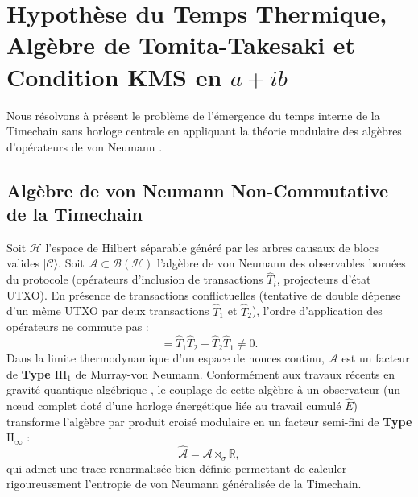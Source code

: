 \documentclass[10pt,twocolumn,a4paper]{article}
\theoremstyle{plain}
\theoremstyle{definition}
\theoremstyle{remark}
\begin{document}
\section{Hypothèse du Temps Thermique, Algèbre de Tomita-Takesaki et Condition KMS en $a + ib$}

Nous résolvons à présent le problème de l'émergence du temps interne de la Timechain sans horloge centrale en appliquant la théorie modulaire des algèbres d'opérateurs de von Neumann \cite{ConnesRovelli1994,Takesaki1970}.

\subsection{Algèbre de von Neumann Non-Commutative de la Timechain}

Soit $\mathcal{H}$ l'espace de Hilbert séparable généré par les arbres causaux de blocs valides $|\mathcal{C}\rangle$. Soit $\mathcal{A} \subset \mathcal{B}(\mathcal{H})$ l'algèbre de von Neumann des observables bornées du protocole (opérateurs d'inclusion de transactions $\hat{T}_i$, projecteurs d'état UTXO). En présence de transactions conflictuelles (tentative de double dépense d'un même UTXO par deux transactions $\hat{T}_1$ et $\hat{T}_2$), l'ordre d'application des opérateurs ne commute pas :
\begin{equation}
    [\hat{T}_1, \hat{T}_2] = \hat{T}_1 \hat{T}_2 - \hat{T}_2 \hat{T}_1 \neq 0.
    \label{eq:NonCommutativity}
\end{equation}
Dans la limite thermodynamique d'un espace de nonces continu, $\mathcal{A}$ est un facteur de \textbf{Type $\text{III}_1$} de Murray-von Neumann. Conformément aux travaux récents en gravité quantique algébrique \cite{Witten2022}, le couplage de cette algèbre à un observateur (un nœud complet doté d'une horloge énergétique liée au travail cumulé $\hat{E}$) transforme l'algèbre par produit croisé modulaire en un facteur semi-fini de \textbf{Type $\text{II}_\infty$} :
\begin{equation}
    \widehat{\mathcal{A}} = \mathcal{A} \rtimes_{\sigma} \mathbb{R},
    \label{eq:CrossedProduct}
\end{equation}
qui admet une trace renormalisée bien définie permettant de calculer rigoureusement l'entropie de von Neumann généralisée de la Timechain.
\end{document}
